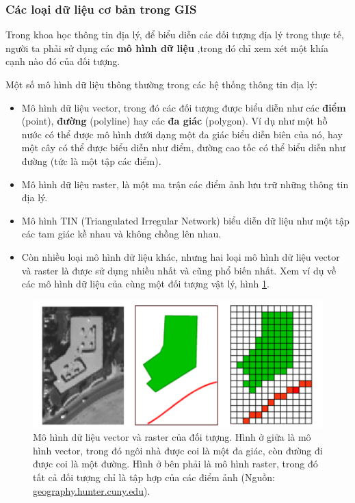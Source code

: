 \documentclass[14pt, oneside, a4paper, openany]{scrartcl}
\begin{document}
\subsubsection{Các loại dữ liệu cơ bản trong GIS}
Trong khoa học thông tin địa lý, để biểu diễn các đối tượng địa lý trong thực tế, người ta phải sử dụng các \textbf{mô hình dữ liệu} ,trong đó chỉ xem xét một khía cạnh nào đó của đối tượng.

Một số mô hình dữ liệu thông thường trong các hệ thống thông tin địa lý:
\begin{itemize}
	\item Mô hình dữ liệu vector, trong đó các đối tượng được biểu diễn như các \textbf{điểm} (point), \textbf{đường} (polyline) hay các \textbf{đa giác} (polygon). Ví dụ như một hồ nước có thể được mô hình dưới dạng một đa giác biểu diễn biên của nó, hay một cây có thể được biểu diễn như điểm, đường cao tốc có thể biểu diễn như đường (tức là một tập các điểm).
	\item Mô hình dữ liệu raster, là một ma trận các điểm ảnh lưu trữ những thông tin địa lý.
	\item Mô hình TIN (Triangulated Irregular Network) biểu diễn dữ liệu như một tập các tam giác kề nhau và không chồng lên nhau.
	\item Còn nhiều loại mô hình dữ liệu khác, nhưng hai loại mô hình dữ liệu vector và raster là được sử dụng nhiều nhất và cũng phổ biến nhất. Xem ví dụ về các mô hình dữ liệu của cùng một đối tượng vật lý, hình \ref{fig:rastervector}.
\end{itemize}

\begin{figure}[!h]
	\centering
	\includegraphics[scale=0.6]{figures/datamodelexample.png} 
	\caption[Mô hình dữ liệu vector và raster của đối tượng]{Mô hình dữ liệu vector và raster của đối tượng. Hình ở giữa là mô hình vector, trong đó ngôi nhà được coi là một đa giác, còn đường đi được coi là một đường. Hình ở bên phải là mô hình raster, trong đó tất cả đối tượng chỉ là tập hợp của các điểm ảnh (Nguồn: \href{http://www.geography.hunter.cuny.edu/~jochen/GTECH361/lectures/lecture05/concepts/03\%20-\%20Geographic\%20data\%20models_files/image003.gif}{geography.hunter.cuny.edu}).}
	\label{fig:rastervector}
\end{figure}
\end{document}
